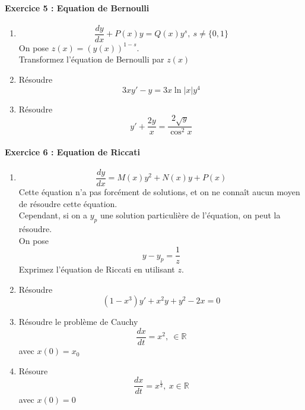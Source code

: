 \documentclass{article}
\begin{document}
\paragraph{Exercice 5 : Equation de Bernoulli \\}
\begin{enumerate}
	\item \[\frac{dy}{dx} + P(x)y = Q(x)y^s,\ s\neq\{0,1\}\]
		On pose $z(x)=(y(x))^{1-s}$.\\
		Transformez l'équation de Bernoulli par $z(x)$
	\item Résoudre \[3xy' - y = 3x\ln|x| y^4\]
	\item Résoudre \[y' + \frac{2y}{x} = \frac{2\sqrt{y}}{\cos^2 x}\] 
\end{enumerate}

\paragraph{Exercice 6 : Equation de Riccati \\}
\begin{enumerate}
\item \[\frac{dy}{dx}=M(x)y^2 + N(x)y + P(x)\]
	Cette équation n'a pas forcément de solutions, et on ne connaît aucun moyen de résoudre cette équation.\\
	Cependant, si on a $y_p$ une solution particulière de l'équation, on peut la résoudre.\\
	On pose \[y-y_p = \frac{1}{z}\]
	Exprimez l'équation de Riccati en utilisant $z$.
\item Résoudre \[(1-x^3)y' + x^2y + y^2 -2x=0\]
\item Résoudre le problème de Cauchy \[\frac{dx}{dt} = x^2,\ \in\mathbb{R}\] avec $x(0)=x_0$
\item Résoure \[\frac{dx}{dt}=x^{\frac{1}{3}},\ x\in\mathbb{R}\] avec $x(0)=0$
\end{enumerate}
\end{document}
